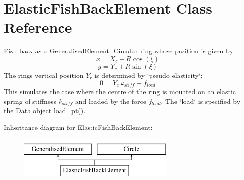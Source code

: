 \hypertarget{classElasticFishBackElement}{}\section{Elastic\+Fish\+Back\+Element Class Reference}
\label{classElasticFishBackElement}


Fish back as a Generalised\+Element\+: Circular ring whose position is given by \[ x = X_c + R \cos(\xi) \] \[ y = Y_c + R \sin(\xi) \] The ring\textquotesingle{}s vertical position $ Y_c $ is determined by \char`\"{}pseudo elasticity\char`\"{}\+: \[ 0 = Y_c \ k_{stiff} - f_{load} \] This simulates the case where the centre of the ring is mounted on an elastic spring of stiffness $ k_{stiff} $ and loaded by the force $ f_{load}. $ The \char`\"{}load\char`\"{} is specified by the Data object {\ttfamily load\+\_\+pt()}.  


Inheritance diagram for Elastic\+Fish\+Back\+Element\+:\begin{figure}[H]
\begin{center}
\leavevmode
\includegraphics[height=2.000000cm]{classElasticFishBackElement}
\end{center}
\end{figure}

